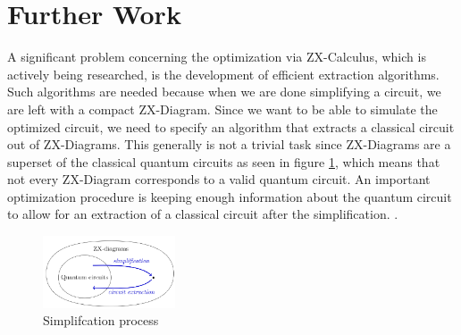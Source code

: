 \section{Further Work}

A significant problem concerning the optimization via ZX-Calculus, which is actively being researched, is the development of efficient extraction algorithms. Such algorithms are needed because when we are done simplifying a circuit, we are left with a compact ZX-Diagram. Since we want to be able to simulate the optimized circuit, we need to specify an algorithm that extracts a classical circuit out of ZX-Diagrams. This generally is not a trivial task since ZX-Diagrams are a superset of the classical quantum circuits\cite{duncan2020simplification} as seen in figure \ref{fig:extraction}, which means that not every ZX-Diagram corresponds to a valid quantum circuit. An important optimization procedure is keeping enough information about the quantum circuit to allow for an extraction of a classical circuit after the simplification. \cite{duncan2020simplification}.

\begin{figure}[h]
    \centering
    \includegraphics[width=0.35\textwidth]{images/extraction.png}
    \caption{Simplifcation process\cite{duncan2020simplification}}
    \label{fig:extraction}
\end{figure}